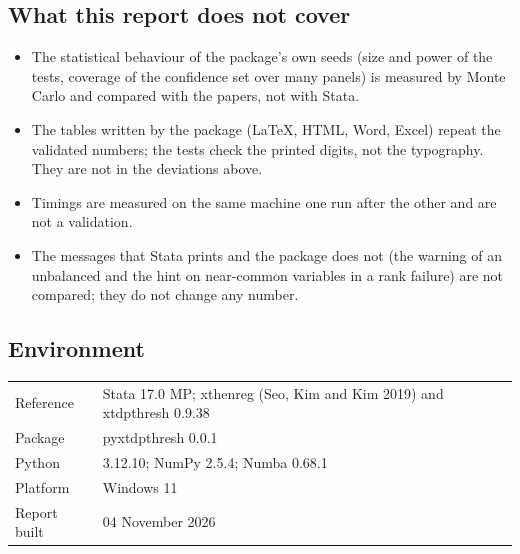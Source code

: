 \documentclass[
  10.5pt,
  a4paper,
]{article}
\begin{document}
\subsection{What this report does not cover}
\begin{itemize}
\item The statistical behaviour of the package's own seeds (size and power of the tests, coverage
of the confidence set over many panels) is measured by Monte Carlo and compared with the papers,
not with Stata.
\item The tables written by the package (LaTeX, HTML, Word, Excel) repeat the validated numbers;
the tests check the printed digits, not the typography. They are not in the deviations above.
\item Timings are measured on the same machine one run after the other and are not a validation.
\item The messages that Stata prints and the package does not (the warning of an unbalanced
 and the hint on near-common variables in a rank failure) are not compared;
they do not change any number.
\end{itemize}
\subsection{Environment}
\begin{tabular}{@{}ll@{}}
Reference & Stata 17.0 MP; xthenreg (Seo, Kim and Kim 2019) and xtdpthresh 0.9.38 \\
Package & pyxtdpthresh 0.0.1 \\
Python & 3.12.10; NumPy 2.5.4; Numba 0.68.1 \\
Platform & Windows 11 \\
Report built & 04 November 2026 \\
\end{tabular}
\end{document}
